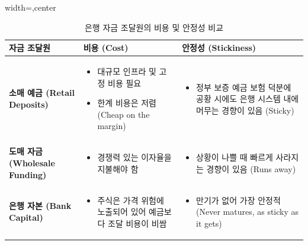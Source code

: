 \documentclass[11pt,a4paper]{article}
\theoremstyle{definition}
\begin{document}
\begin{table}[h!]
    \centering
    \caption{은행 자금 조달원의 비용 및 안정성 비교}
    \label{tab:funding_comparison}
    \begin{adjustbox}{width=\textwidth,center}
    \begin{tabular}{p{}p{}p{}}
        \toprule
        \textbf{자금 조달원} & \textbf{비용 (Cost)} & \textbf{안정성 (Stickiness)} \\
        \midrule
        \textbf{소매 예금 (Retail Deposits)} &
        \begin{itemize}
            \item 대규모 인프라 및 고정 비용 필요
            \item 한계 비용은 저렴 (Cheap on the margin)
        \end{itemize} &
        \begin{itemize}
            \item 정부 보증 예금 보험 덕분에 공황 시에도 은행 시스템 내에 머무는 경향이 있음 (Sticky)
        \end{itemize} \\
        \addlinespace
        \textbf{도매 자금 (Wholesale Funding)} &
        \begin{itemize}
            \item 경쟁력 있는 이자율을 지불해야 함
        \end{itemize} &
        \begin{itemize}
            \item 상황이 나쁠 때 빠르게 사라지는 경향이 있음 (Runs away)
        \end{itemize} \\
        \addlinespace
        \textbf{은행 자본 (Bank Capital)} &
        \begin{itemize}
            \item 주식은 가격 위험에 노출되어 있어 예금보다 조달 비용이 비쌈
        \end{itemize} &
        \begin{itemize}
            \item 만기가 없어 가장 안정적 (Never matures, as sticky as it gets)
        \end{itemize} \\
        \bottomrule
    \end{tabular}
    \end{adjustbox}
\end{table}

\newpage
\end{document}
